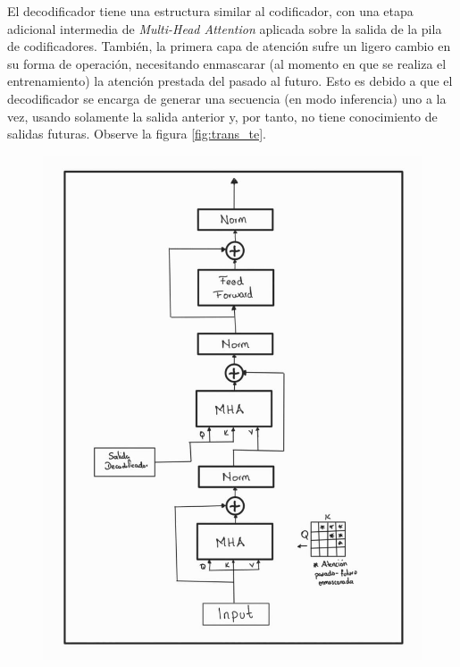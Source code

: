 El decodificador tiene una estructura similar al codificador, con una etapa adicional intermedia
de \textit{Multi-Head Attention} aplicada sobre la salida de la pila de codificadores. También, la
primera capa de atención sufre un ligero cambio en su forma de operación, necesitando enmascarar (al
momento en que se realiza el entrenamiento) la atención prestada del pasado al futuro. Esto es debido
a que el decodificador se encarga de generar una secuencia (en modo inferencia) uno a la vez, usando
solamente la salida anterior y, por tanto, no tiene conocimiento de salidas futuras. Observe la figura
\ref{fig:trans_te}.


\begin{figure}[ht!]
\centering
    \begin{minipage}{.4\textwidth}
        \centering
        \includegraphics[width=1.0 \textwidth]{Chapters/2. Transformer/Figures/transformer/decoder.jpg}
    \end{minipage}
    \begin{minipage}{.5\textwidth}

\end{minipage}
\end{figure}
